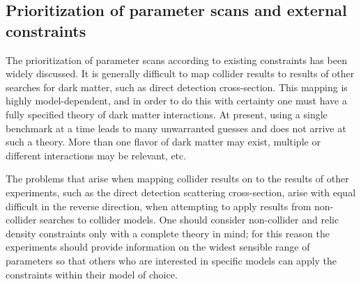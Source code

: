 \documentclass[a4,debug,notitlepage,nobib]{tufte-handout}
\begin{document}


\subsection{Prioritization of parameter scans and external constraints}

The prioritization of parameter scans according to existing constraints 
has been widely discussed. It is generally difficult to map
collider results to results of other searches for dark matter, such as
direct detection cross-section. This mapping is highly
model-dependent, and in order to do this with certainty one must have
a fully specified theory of dark matter interactions. At present,
using a single benchmark at a time leads to many unwarranted guesses
and does not arrive at such a theory.  More than one flavor of dark
matter may exist, multiple or different interactions may be relevant,
etc.

The problems that arise when mapping collider results on to the
results of other experiments, such as the direct detection scattering
cross-section, arise with equal difficult in the reverse direction,
when attempting to apply results from non-collider searches to
collider models. One should consider non-collider and relic density
constraints only with a complete theory in mind; for this reason the
experiments should provide information on the widest sensible range of
parameters so that others who are interested in specific models can
apply the constraints within their model of choice.
\end{document}
